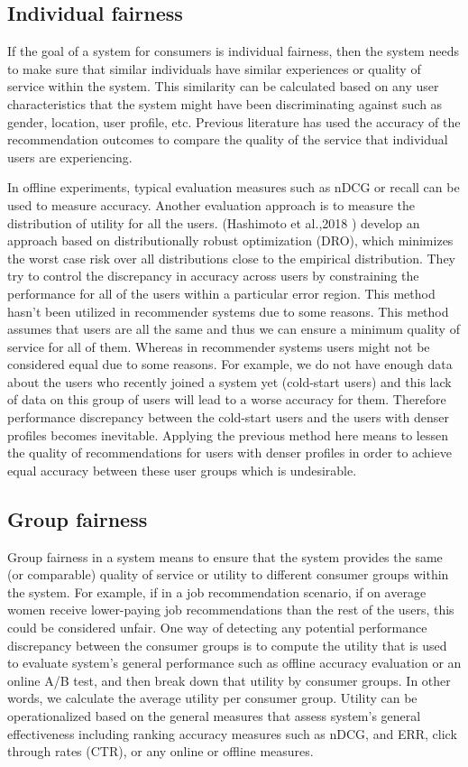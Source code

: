     \subsection{Individual fairness}
    If the goal of a system for consumers is individual fairness, then the system needs to make sure that similar individuals have similar experiences or quality of service within the system. This similarity can be calculated based on any user characteristics that the system might have been discriminating against such as gender, location, user profile, etc. Previous literature has used the accuracy of the recommendation outcomes to compare the quality of the service that individual users are experiencing. 
    
    In offline experiments, typical evaluation measures such as nDCG or recall can be used to measure accuracy. Another evaluation approach is to measure the distribution of utility for all the users. (Hashimoto et al.,2018 \cite{hashimoto2018fairness}) develop an approach based on distributionally robust optimization (DRO), which minimizes the worst case risk over all distributions close to the empirical distribution. They try to control the discrepancy in accuracy across users by constraining the performance for all of the users within a particular error region. This method hasn't been utilized in recommender systems due to some reasons. This method assumes that users are all the same and thus we can ensure a minimum quality of service for all of them. Whereas in recommender systems users might not be considered equal due to some reasons. For example, we do not have enough data about the users who recently joined a system yet (cold-start users) and this lack of data on this group of users will lead to a worse accuracy for them. Therefore performance discrepancy between the cold-start users and the users with denser profiles becomes inevitable. Applying the previous method here means to lessen the quality of recommendations for users with denser profiles in order to achieve equal accuracy between these user groups which is undesirable.
    
    \subsection{Group fairness}
    Group fairness in a system means to ensure that the system provides the same (or comparable) quality of service or utility to different consumer groups within the system. For example, if in a job recommendation scenario, if on average women receive lower-paying job recommendations than the rest of the users, this could be considered unfair.
    One way of detecting any potential performance discrepancy between the consumer groups is to compute the utility that is used to evaluate system's general performance such as offline accuracy evaluation or an online A/B test, and then break down that utility by consumer groups. In other words, we calculate the average utility per consumer group. Utility can be operationalized based on the general measures that assess system's general effectiveness including ranking accuracy measures such as nDCG, and ERR, click through rates (CTR), or any online or offline measures.  
    
